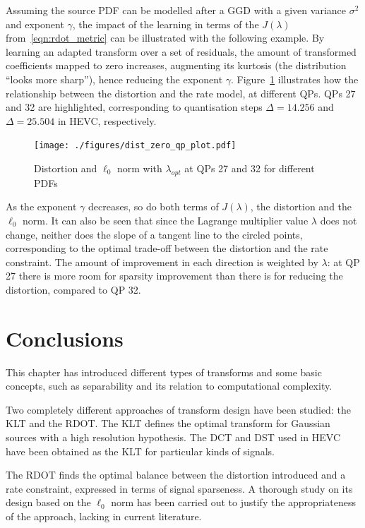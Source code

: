 \documentclass[11pt,a4paper,openright,twoside]{book}
\numberwithin{equation}{section} %
\numberwithin{figure}{section} %
\numberwithin{table}{section} %
\begin{document}
Assuming the source \ac{PDF} can be modelled after a \ac{GGD} with a
given variance $\sigma^2$ and exponent $\gamma$, the impact of the
learning in terms of the $J(\lambda)$ from~\eqref{eqn:rdot_metric} can
be illustrated with the following example.
By learning an adapted transform over a set of residuals, the amount of
transformed coefficients mapped to zero increases, augmenting its
kurtosis (the distribution ``looks more sharp''), hence reducing the
exponent $\gamma$.
Figure~\ref{fig:lambda_zero_norm_dist} illustrates how the relationship
between the distortion and the rate model, at different \acp{QP}.
\acp{QP} 27 and 32 are highlighted, corresponding to quantisation steps
$\Delta = 14.256$ and $\Delta = 25.504$ in \ac{HEVC}, respectively.

\begin{figure}[tp]
	\centering
	\texttt{[image: ./figures/dist\_zero\_qp\_plot.pdf]}
	\caption{Distortion and $\ell_0$ norm with $\lambda_{opt}$ at
	\acsp{QP} 27 and 32 for different \acsp{PDF}}
	\label{fig:lambda_zero_norm_dist}
\end{figure}

As the exponent $\gamma$ decreases, so do both terms of $J(\lambda)$,
the distortion and the $\ell_0$ norm.
It can also be seen that since the Lagrange multiplier value $\lambda$
does not change, neither does the slope of a tangent line to the circled
points, corresponding to the optimal trade-off between the distortion
and the rate constraint.
The amount of improvement in each direction is weighted by $\lambda$: at
\ac{QP} 27 there is more room for sparsity improvement than there is for
reducing the distortion, compared to \ac{QP} 32.

\section{Conclusions}
\label{sec:conclusions_transforms}

This chapter has introduced different types of transforms and some
basic concepts, such as separability and its relation to computational
complexity.

Two completely different approaches of transform design have been
studied: the \ac{KLT} and the \ac{RDOT}.
The \ac{KLT} defines the optimal transform for Gaussian sources with a
high resolution hypothesis.
The \ac{DCT} and \ac{DST} used in \ac{HEVC} have been obtained as the
\ac{KLT} for particular kinds of signals.

The \ac{RDOT} finds the optimal balance between the distortion
introduced and a rate constraint, expressed in terms of signal sparseness.
A thorough study on its design based on the $\ell_0$ norm has been carried out
to justify the appropriateness of the approach, lacking in current literature.
\end{document}
